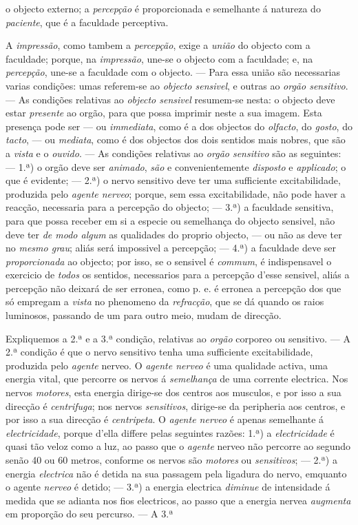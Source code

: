 o objecto externo; a \emph{percepção} é proporcionada e semelhante á natureza do \emph{paciente}, que é a faculdade perceptiva.\par A \emph{impressão}, como tambem a \emph{percepção}, exige a \emph{união} do objecto com a faculdade; porque, na \emph{impressão}, une-se o objecto com a faculdade; e, na \emph{percepção}, une-se a faculdade com o objecto. --- Para essa união são necessarias varias condições: umas referem-se ao \emph{objecto sensivel}, e outras ao \emph{orgão sensitivo}. --- As condições relativas ao \emph{objecto sensivel} resumem-se nesta: o objecto deve estar \emph{presente} ao orgão, para que possa imprimir neste a sua imagem. Esta presença pode ser --- ou \emph{immediata}, como é a dos objectos do \emph{olfacto}, do \emph{gosto}, do \emph{tacto}, --- ou \emph{mediata}, como é dos objectos dos dois sentidos mais nobres, que são a \emph{vista} e o \emph{ouvido}. --- As condições relativas ao \emph{orgão sensitivo} são as seguintes: --- 1.ª) o orgão deve ser \emph{animado}, \emph{são} e convenientemente \emph{disposto} e \emph{applicado}; o que é evidente; --- 2.ª) o nervo sensitivo deve ter uma sufficiente excitabilidade, produzida pelo \emph{agente nerveo}; porque, sem essa excitabilidade, não pode haver a reacção, necessaria para a percepção do objecto; --- 3.ª) a faculdade sensitiva, para que possa receber em si a especie ou semelhança do objecto sensivel, não deve ter \emph{de modo algum} as qualidades do proprio objecto, --- ou não as deve ter no \emph{mesmo grau}; aliás será impossivel a percepção; --- 4.ª) a faculdade deve ser \emph{proporcionada} ao objecto; por isso, se o sensivel é \emph{commum}, é indispensavel o exercicio de \emph{todos} os sentidos, necessarios para a percepção d'esse sensivel, aliás a percepção não deixará de ser erronea, como p. e. é erronea a percepção dos que só empregam a \emph{vista} no phenomeno da \emph{refracção}, que se dá quando os raios luminosos, passando de um para outro meio, mudam de direcção.\par Expliquemos a 2.ª e a 3.ª condição, relativas ao \emph{orgão} corporeo ou sensitivo. --- A 2.ª condição é que o nervo sensitivo tenha uma sufficiente excitabilidade, produzida pelo \emph{agente} nerveo. O \emph{agente nerveo} é uma qualidade activa, uma energia vital, que percorre os nervos á \emph{semelhança} de uma corrente electrica. Nos nervos \emph{motores}, esta energia dirige-se dos centros aos musculos, e por isso a sua direcção é \emph{centrifuga}; nos nervos \emph{sensitivos}, dirige-se da peripheria aos centros, e por isso a sua direcção é \emph{centripeta}. O \emph{agente nerveo} é apenas semelhante á \emph{electricidade}, porque d'ella differe pelas seguintes razões: 1.ª) a \emph{electricidade} é quasi tão veloz como a luz, ao passo que o \emph{agente} nerveo não percorre ao segundo senão 40 ou 60 metros, conforme os nervos são \emph{motores} ou \emph{sensitivos}; --- 2.ª) a energia \emph{electrica} não é detida na sua passagem pela ligadura do nervo, emquanto o agente \emph{nerveo} é detido; --- 3.ª) a energia electrica \emph{diminue} de intensidade á medida que se adianta nos fios electricos, ao passo que a energia nervea \emph{augmenta} em proporção do seu percurso. --- A 3.ª 